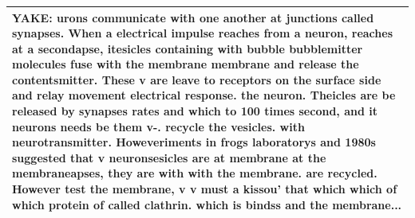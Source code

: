 \begin{table}[htbp]
\begin{tabular}{|p{12cm}|}
\textbf{YAKE:} \colorbox{green!20}{urons communicate with one} \colorbox{green!20}{another at junctions called} \colorbox{green!20}{synapses}. \colorbox{green!20}{When a electrical impulse} \colorbox{green!20}{reaches from a neuron,} \colorbox{green!20}{reaches at a} secondapse, \colorbox{green!20}{itesicles containing with} bubble bubblemitter molecules \colorbox{green!20}{fuse with the membrane} membrane and \colorbox{green!20}{release the} contentsmitter. \colorbox{green!20}{These v are leave to} \colorbox{green!20}{receptors on the surface} side and relay movement electrical response. the neuron. \colorbox{green!20}{Theicles are be released by} \colorbox{green!20}{synapses rates} and which to 100 times second, and it neurons needs be them v-. recycle the vesicles. with neurotransmitter. Howeveriments in frogs laboratorys and 1980s suggested that v neuronsesicles are at membrane at the membraneapses, they are with with the membrane. are recycled. However test the membrane, v v must a kissou' that which which of which protein of called clathrin. which is bindss and the membrane... \\
\hline
\end{tabular}
\end{table}

% 
%
